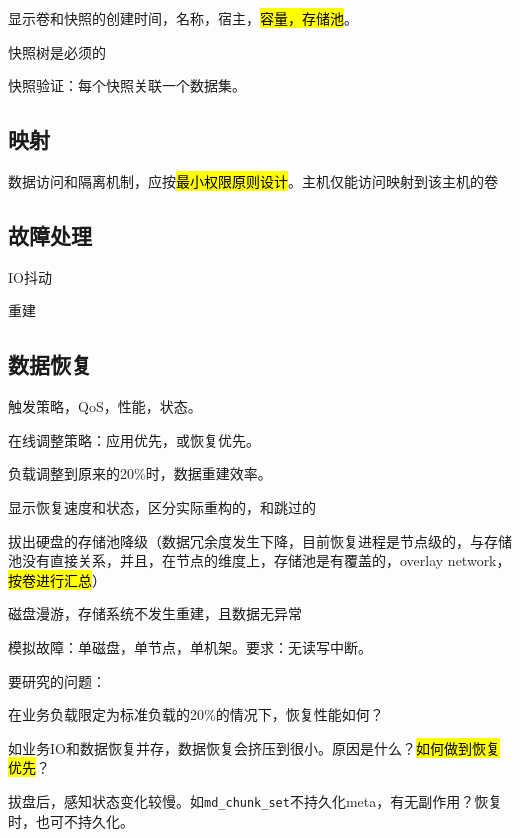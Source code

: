 \begin{enumbox}
\item 显示卷和快照的创建时间，名称，宿主，\hl{容量，存储池}。
\item 快照树是必须的
\item 快照验证：每个快照关联一个数据集。
\end{enumbox}

\subsection{映射}

数据访问和隔离机制，应按\hl{最小权限原则设计}。主机仅能访问映射到该主机的卷

\subsection{故障处理}

\begin{enumbox}
\item IO抖动
\item 重建
\end{enumbox}

\subsection{数据恢复}

触发策略，QoS，性能，状态。

\begin{enumbox}
\item 在线调整策略：应用优先，或恢复优先。
\item 负载调整到原来的20\%时，数据重建效率。
\item 显示恢复速度和状态，区分实际重构的，和跳过的
\item 拔出硬盘的存储池降级（数据冗余度发生下降，目前恢复进程是节点级的，与存储池没有直接关系，并且，在节点的维度上，存储池是有覆盖的，overlay network，\hl{按卷进行汇总}）
\item 磁盘漫游，存储系统不发生重建，且数据无异常
\item 模拟故障：单磁盘，单节点，单机架。要求：无读写中断。
\end{enumbox}

要研究的问题：
\begin{enumbox}
\item 在业务负载限定为标准负载的20\%的情况下，恢复性能如何？
\item 如业务IO和数据恢复并存，数据恢复会挤压到很小。原因是什么？\hl{如何做到恢复优先}？
\item 拔盘后，感知状态变化较慢。如\verb|md_chunk_set|不持久化meta，有无副作用？恢复时，也可不持久化。
\end{enumbox}

